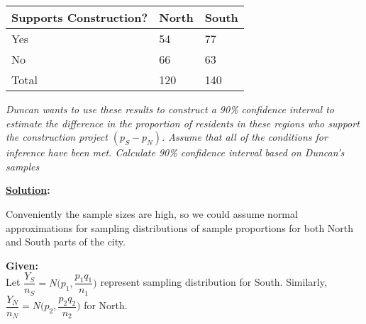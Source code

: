 \documentclass[float=false,crop=false]{standalone}
\begin{document}
\begin{longtable}[]{@{}lll@{}}
\toprule
Supports Construction? & North & South\tabularnewline
\midrule
\endhead
Yes & 54 & 77\tabularnewline
No & 66 & 63\tabularnewline
Total & 120 & 140\tabularnewline
\bottomrule
\end{longtable}

\emph{Duncan wants to use these results to construct a 90\% confidence
interval to estimate the difference in the proportion of residents in
these regions who support the construction project \((p_S-p_N)\). Assume
that all of the conditions for inference have been met. Calculate 90\%
confidence interval based on Duncan's samples}

    \textbf{\href{https://www.khanacademy.org/math/ap-statistics/two-sample-inference/two-sample-z-interval-proportions/v/calculating-two-sample-z-interval-confidence-interval-for-difference-of-proportions}{Solution}:}

Conveniently the sample sizes are high, so we could assume normal
approximations for sampling distributions of sample proportions for both
North and South parts of the city.

\textbf{Given:}\\
Let \(\dfrac{Y_S}{n_S} = N\Big(p_1, \dfrac{p_1q_1}{n_1}\Big)\) represent
sampling distribution for South. Similarly,
\(\dfrac{Y_N}{n_N} = N\Big(p_2, \dfrac{p_2q_2}{n_2}\Big)\) for North.
\end{document}
